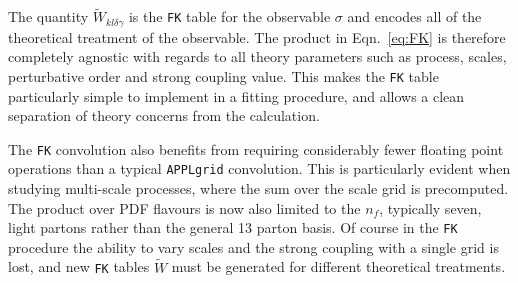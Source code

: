 The quantity $\widetilde{W}_{kl\delta\gamma}$ is the {\tt FK} table for the observable $\sigma$ and encodes all of the theoretical treatment of the observable. The product in Eqn.~\ref{eq:FK} is therefore completely
agnostic with regards to all theory parameters such as process, scales, perturbative order and strong coupling value. This makes the {\tt FK} table particularly simple to implement in a fitting procedure, and allows a clean separation
of theory concerns from the calculation.

The {\tt FK} convolution also benefits from requiring considerably fewer floating point operations than a typical { \tt APPLgrid} convolution. This is particularly evident when studying multi-scale processes, where the sum over the scale grid is precomputed. The product over PDF flavours is now also limited to the $n_f$, typically seven, light partons rather than the general 13 parton basis. Of course in the {\tt FK} procedure the ability to vary scales and the strong coupling with a single grid is lost, and new {\tt FK} tables $\widetilde{W}$ must be generated for different theoretical treatments.

